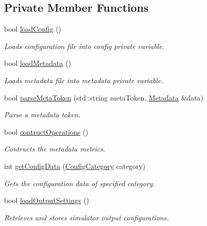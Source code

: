 \subsection*{Private Member Functions}
\begin{DoxyCompactItemize}
\item 
bool \hyperlink{class_simulator_a435acd1b33b92d62c93e7753d44630dd}{load\+Config} ()
\begin{DoxyCompactList}\small\item\em Loads configuration file into \textquotesingle{}config\textquotesingle{} private variable. \end{DoxyCompactList}\item 
bool \hyperlink{class_simulator_a2291f67b3ef8be115f4bb34e035b2acc}{load\+Metadata} ()
\begin{DoxyCompactList}\small\item\em Loads metadata file into \textquotesingle{}metadata\textquotesingle{} private variable. \end{DoxyCompactList}\item 
bool \hyperlink{class_simulator_a8fe2c4165b8ce64b915b3f1cb4b68eae}{parse\+Meta\+Token} (std\+::string meta\+Token, \hyperlink{struct_metadata}{Metadata} \&data)
\begin{DoxyCompactList}\small\item\em Parse a metadata token. \end{DoxyCompactList}\item 
bool \hyperlink{class_simulator_ae032a5b2c6f4bb5ae3f129b070b37998}{contruct\+Operations} ()
\begin{DoxyCompactList}\small\item\em Contructs the metadata metrics. \end{DoxyCompactList}\item 
int \hyperlink{class_simulator_ad89fec9f00924c116670418f2dd43b14}{get\+Config\+Data} (\hyperlink{_sim_data_structs_8h_a32f23b552ade08d96d49cc3061a27165}{Config\+Category} category)
\begin{DoxyCompactList}\small\item\em Gets the configuration data of specified category. \end{DoxyCompactList}\item 
bool \hyperlink{class_simulator_a8cf2f0d42cabac22dc4b6eda745189ae}{load\+Output\+Settings} ()
\begin{DoxyCompactList}\small\item\em Retrieves and stores simulator output configurations. \end{DoxyCompactList}\item 

\end{DoxyCompactItemize}
